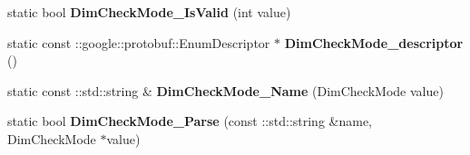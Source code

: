 \begin{DoxyCompactItemize}
\item 
\mbox{\label{classcaffe_1_1_param_spec_aa50c09a24412889a2899e84bc4871fea}} 
static bool {\bfseries Dim\+Check\+Mode\+\_\+\+Is\+Valid} (int value)
\item 
\mbox{\label{classcaffe_1_1_param_spec_abbda783bae74833e5c309ed32feb22da}} 
static const \+::google\+::protobuf\+::\+Enum\+Descriptor $\ast$ {\bfseries Dim\+Check\+Mode\+\_\+descriptor} ()
\item 
\mbox{\label{classcaffe_1_1_param_spec_a3ed2b779a8062a2e448d5e9fccf0868a}} 
static const \+::std\+::string \& {\bfseries Dim\+Check\+Mode\+\_\+\+Name} (Dim\+Check\+Mode value)
\item 
\mbox{\label{classcaffe_1_1_param_spec_a444e596b7ebbec00ab22558d30e62871}} 
static bool {\bfseries Dim\+Check\+Mode\+\_\+\+Parse} (const \+::std\+::string \&name, Dim\+Check\+Mode $\ast$value)
\end{DoxyCompactItemize}
